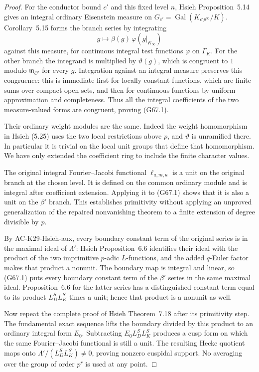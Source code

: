\begin{proof}
For the conductor bound $c'$ and this fixed level $n$, Hsieh
Proposition~5.14 gives an integral ordinary Eisenstein measure
on $G_{c'}=\operatorname{Gal}(K_{c'p^\infty}/K)$.
Corollary~5.15 forms the branch series by integrating
\[
        g\longmapsto\beta(g)\,
                  \varphi(g|_{K_\infty})
\]
against this measure, for continuous integral test functions
$\varphi$ on $\Gamma_K$.
For the other branch the integrand is multiplied by
$\vartheta(g)$, which is congruent to $1$ modulo
$\mathfrak m_{\mathcal O'}$ for every $g$.
Integration against an integral measure preserves this
congruence: this is immediate first for locally constant
functions, which are finite sums over compact open sets, and
then for continuous functions by uniform approximation and
completeness.  Thus all the integral coefficients of the two
measure-valued forms are congruent, proving (G67.1).

Their ordinary weight modules are the same.  Indeed the weight
homomorphism in Hsieh (5.25) uses the two local restrictions
above $p$, and $\vartheta$ is unramified there.  In particular
it is trivial on the local unit groups that define that
homomorphism.  We have only extended the coefficient ring to
include the finite character values.

The original integral Fourier--Jacobi functional
$\ell_{a,m,\kappa}$ is a unit on the original branch at the
chosen level.  It is defined on the common ordinary module
and is integral after coefficient extension.  Applying it to
(G67.1) shows that it is also a unit on the $\beta'$ branch.
This establishes primitivity without applying an unproved
generalization of the repaired nonvanishing theorem to a
finite extension of degree divisible by $p$.

By AC-K29-Hsieh-aux, every boundary constant term of the original
series is in the maximal ideal of $\Lambda'$: Hsieh
Proposition~6.6 identifies their ideal with the product of the
two imprimitive $p$-adic $L$-functions, and the added $q$-Euler
factor makes that product a nonunit.  The boundary map is
integral and linear, so (G67.1) puts every boundary constant
term of the $\beta'$ series in the same maximal ideal.
Proposition~6.6 for the latter series has a distinguished
constant term equal to its product $L_D^S L_K^S$ times a unit;
hence that product is a nonunit as well.

Now repeat the complete proof of Hsieh Theorem~7.18 after its
primitivity step.  The fundamental exact sequence lifts the
boundary divided by this product to an ordinary integral form
$E_0$.  Subtracting $E_0L_D^SL_K^S$ produces a cusp form on
which the same Fourier--Jacobi functional is still a unit.
The resulting Hecke quotient maps onto
$\Lambda'/(L_D^SL_K^S)\ne0$, proving nonzero cuspidal support.
No averaging over the group of order $p^r$ is used at any point.
\end{proof}

